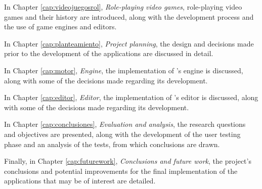 \medskip

In Chapter \ref{cap:videojuegosrol}, \textit{Role-playing video games}, role-playing video games and their history are introduced, along with the development process and the use of game engines and editors.

\medskip

In Chapter \ref{cap:planteamiento}, \textit{Project planning}, the design and decisions made prior to the development of the applications are discussed in detail.

\medskip

In Chapter \ref{cap:motor}, \textit{Engine}, the implementation of \baker's engine is discussed, along with some of the decisions made regarding its development.
\medskip

In Chapter \ref{cap:editor}, \textit{Editor}, the implementation of \baker's editor is discussed, along with some of the decisions made regarding its development.

\medskip

In Chapter \ref{cap:conclusiones}, \textit{Evaluation and analysis}, the research questions and objectives are presented, along with the development of the user testing phase and an analysis of the tests, from which conclusions are drawn.

\medskip

Finally, in Chapter \ref{cap:futurework}, \textit{Conclusions and future work}, the project's conclusions and potential improvements for the final implementation of the applications that may be of interest are detailed.








